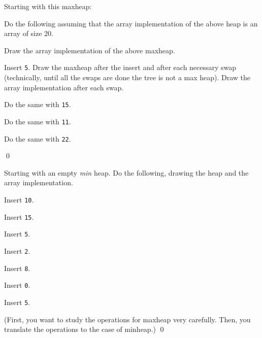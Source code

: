 \newpage
\begin{ex}
  Starting with this maxheap:




Do the following assuming that the array implementation
of the above heap is an array of size 20.
\begin{tightlist}
\item Draw the array implementation of the above maxheap.
\item Insert \texttt{5}. Draw the maxheap after the insert
and after each necessary swap (technically, until all the swaps are done
the tree is not a max heap). Draw the array implementation
after each swap.
\item Do the same with \texttt{15}.
\item Do the same with \texttt{11}.
\item Do the same with \texttt{22}.
\end{tightlist}
\qed
\end{ex}


\newpage
\begin{ex}
Starting with an empty \textit{min} heap.
Do the following, drawing the heap and the array implementation.
\begin{tightlist}
  \item Insert \texttt{10}.
  \item Insert \texttt{15}.
  \item Insert \texttt{5}.
  \item Insert \texttt{2}.
  \item Insert \texttt{8}.
  \item Insert \texttt{0}.
  \item Insert \texttt{5}.
\end{tightlist}
(First, you want to study the operations for maxheap very carefully.
Then, you translate the operations to the case of minheap.)
\qed
\end{ex}

